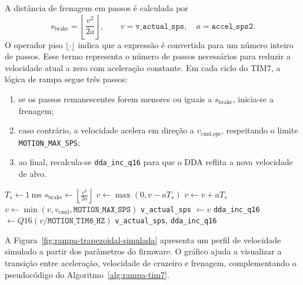 A dist\^ancia de frenagem em passos \'e calculada por
\begin{equation}
    s_{\text{brake}} =
    \left\lfloor \frac{v^2}{2a} \right\rfloor,
    \qquad
    v = \texttt{v\_actual\_sps},
    \quad
    a = \texttt{accel\_sps2}.
\end{equation}
O operador piso $\lfloor \cdot \rfloor$ indica que a express\~ao \'e
convertida para um n\'umero inteiro de passos. Esse termo representa o
n\'umero de passos necess\'arios para reduzir a
velocidade atual a zero com acelera\c{c}\~ao constante. Em cada ciclo do
TIM7, a l\'ogica de rampa segue tr\^es passos:
\begin{enumerate}
\item se os passos remanescentes forem menores ou iguais a
  $s_{\text{brake}}$, inicia-se a frenagem;
\item caso contr\'ario, a velocidade acelera em dire\c{c}\~ao a
  $v_{\text{cmd,sps}}$, respeitando o limite
  \texttt{MOTION\_MAX\_SPS};
\item ao final, recalcula-se \texttt{dda\_inc\_q16} para que o DDA reflita
  a nova velocidade de alvo.
\end{enumerate}

\begin{algorithm}[H]
    \caption{Atualiza\c{c}\~ao da rampa trapezoidal no TIM7 (por eixo).}
    \label{alg:rampa-tim7}
    \begin{algorithmic}[1]
            \State $T_s \gets \SI{1}{\milli\second}$
            \State $s_{\text{brake}} \gets \left\lfloor \frac{v^2}{2a} \right\rfloor$
                \State $v \gets \max(0, v - aT_s)$
            \Else
                \State $v \gets v + aT_s$
                \State $v \gets \min(v, v_{\text{cmd}}, \texttt{MOTION\_MAX\_SPS})$
            \EndIf
            \State \texttt{v\_actual\_sps} $\gets v$
            \State \texttt{dda\_inc\_q16} $\gets Q16(v/\texttt{MOTION\_TIM6\_HZ})$
            \State \Return \texttt{v\_actual\_sps}, \texttt{dda\_inc\_q16}
        \EndProcedure
    \end{algorithmic}
\end{algorithm}

A Figura~\ref{fig:rampa-trapezoidal-simulada} apresenta um perfil de
velocidade simulado a partir dos par\^ametros do firmware. O gr\'afico
ajuda a visualizar a transi\c{c}\~ao entre acelera\c{c}\~ao, velocidade de
cruzeiro e frenagem, complementando o pseudoc\'odigo do
Algoritmo~\ref{alg:rampa-tim7}.

